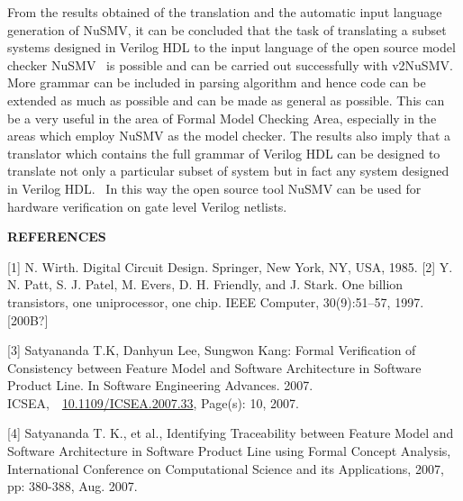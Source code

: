 \documentclass[a4paper]{article}
\begin{document}
{\rmfamily\color[rgb]{0.0,0.0,0.039215688}
From the results obtained of the translation and the automatic input
language generation of NuSMV, it can be concluded that the task of
translating a subset systems designed in Verilog HDL to the input
language of the open source model checker NuSMV \ is possible and can
be carried out successfully with v2NuSMV. More grammar can be included
in parsing algorithm and hence code can be extended as much as possible
and can be made as general as possible. This can be a very useful in
the area of Formal Model Checking Area, especially in the areas which
employ NuSMV as the model checker. The results also imply that a
translator which contains the full grammar of Verilog HDL can be
designed to translate not only a particular subset of system but in
fact any system designed in Verilog HDL. \ In this way the open source
tool NuSMV can be used for hardware verification on gate level Verilog
netlists.\ }


\bigskip

{\centering\color[rgb]{0.0,0.0,0.039215688}
\textrm{\textbf{REFERENCES\ }}
\par}

{\color[rgb]{0.0,0.0,0.039215688}
\textcolor[rgb]{0.13333334,0.13333334,0.13333334}{[1] N. Wirth. Digital
Circuit Design. Springer, New York, NY, USA, 1985.}\newline
\textcolor[rgb]{0.13333334,0.13333334,0.13333334}{[2] Y. N. Patt, S. J.
Patel, M. Evers, D. H. Friendly, and J. Stark. One billion transistors,
one uniprocessor, one chip. IEEE Computer, 30(9):51--57, 1997.[200B?]}}

{\color[rgb]{0.0,0.0,0.039215688}
\textcolor[rgb]{0.13333334,0.13333334,0.13333334}{[3] Satyananda T.K,
Danhyun Lee, Sungwon Kang: Formal Verification of Consistency between
Feature Model and Software Architecture in Software Product Line. In
Software Engineering Advances. 2007.
ICSEA,~}\textcolor[rgb]{0.13333334,0.13333334,0.13333334}{~}\href{http://dx.doi.org/10.1109/ICSEA.2007.33}{\foreignlanguage{english}{\textcolor[rgb]{0.06666667,0.33333334,0.8}{10.1109/ICSEA.2007.33}}}\textcolor[rgb]{0.13333334,0.13333334,0.13333334}{,
Page(s): 10, 2007.}}

{\color[rgb]{0.0,0.0,0.039215688}
\textcolor[rgb]{0.13333334,0.13333334,0.13333334}{[4] Satyananda T. K.,
et al., Identifying Traceability between Feature Model and Software
Architecture in Software Product Line using Formal Concept Analysis,
International Conference on Computational Science and its Applications,
2007, pp: 380-388, Aug. 2007.}}
\end{document}
